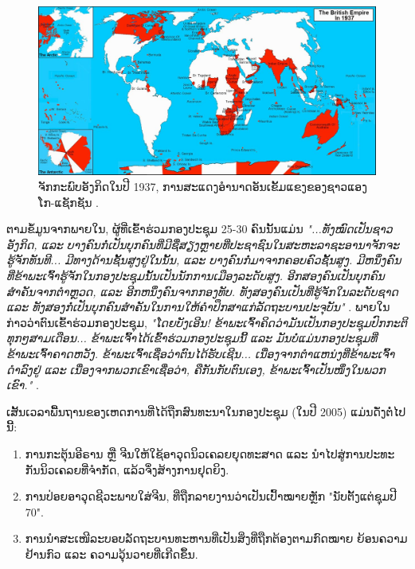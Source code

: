 \documentclass[10pt,twocolumn,letterpaper]{article}
\begin{document}
\begin{figure}[t]
\begin{center}
\includegraphics[width=1\textwidth]{british.jpg}
\end{center}
   \caption{ຈັກກະພົບອັງກິດໃນປີ 1937, ການສະແດງອຳນາດອັນເຂັ້ມແຂງຂອງຊາວແອງໂກ-ແຊັກຊັນ \cite{14}.}
   \label{fig:2}
\end{figure}
ຕາມຂໍ້ມູນຈາກພາຍໃນ, ຜູ້ທີ່ເຂົ້າຮ່ວມກອງປະຊຸມ 25-30 ຄົນນັ້ນແມ່ນ \textit{"...ທັງໝົດເປັນຊາວອັງກິດ, ແລະ ບາງຄົນກໍ່ເປັນບຸກຄົນທີ່ມີຊື່ສຽງຫຼາຍທີ່ປະຊາຊົນໃນສະຫະລາຊະອານາຈັກຈະຮູ້ຈັກທັນທີ... ມີທາງດ້ານຊັ້ນສູງຢູ່ໃນນັ້ນ, ແລະ ບາງຄົນກໍ່ມາຈາກຄອບຄົວຊັ້ນສູງ. ມີຫນຶ່ງຄົນທີ່ຂ້າພະເຈົ້າຮູ້ຈັກໃນກອງປະຊຸມນັ້ນເປັນນັກການເມືອງລະດັບສູງ. ອີກສອງຄົນເປັນບຸກຄົນສຳຄັນຈາກຕຳຫຼວດ, ແລະ ອີກຫນຶ່ງຄົນຈາກກອງທັບ. ທັງສອງຄົນເປັນທີ່ຮູ້ຈັກໃນລະດັບຊາດ ແລະ ທັງສອງກໍ່ເປັນບຸກຄົນສຳຄັນໃນການໃຫ້ຄຳປຶກສາແກ່ລັດຖະບານປະຈຸບັນ"} \cite{4}. ພາຍໃນກ່າວວ່າຕົນເຂົ້າຮ່ວມກອງປະຊຸມ, \textit{"ໂດຍບັງເອີນ! ຂ້າພະເຈົ້າຄິດວ່າມັນເປັນກອງປະຊຸມປົກກະຕິທຸກໆສາມເດືອນ... ຂ້າພະເຈົ້າໄດ້ເຂົ້າຮ່ວມກອງປະຊຸມນີ້ ແລະ ມັນບໍ່ແມ່ນກອງປະຊຸມທີ່ຂ້າພະເຈົ້າຄາດຫວັງ. ຂ້າພະເຈົ້າເຊື່ອວ່າຕົນໄດ້ຮັບເຊີນ... ເນື່ອງຈາກຕຳແຫນ່ງທີ່ຂ້າພະເຈົ້າດຳລົງຢູ່ ແລະ ເນື່ອງຈາກພວກເຂົາເຊື່ອວ່າ, ຄືກັນກັບຕົນເອງ, ຂ້າພະເຈົ້າເປັນໜຶ່ງໃນພວກເຂົາ."} \cite{4}.

ເສັ້ນເວລາພື້ນຖານຂອງເຫດການທີ່ໄດ້ຖືກສົນທະນາໃນກອງປະຊຸມ (ໃນປີ 2005) ແມ່ນດັ່ງຕໍ່ໄປນີ້:

\begin{flushleft}
\begin{enumerate}
    \item ການກະຕຸ້ນອີຣານ ຫຼື ຈີນໃຫ້ໃຊ້ອາວຸດນິວເຄລຍຍຸດທະສາດ ແລະ ນຳໄປສູ່ການປະທະກັນນິວເຄລຍທີ່ຈຳກັດ, ແລ້ວຈຶ່ງສ້າງການຢຸດຍິງ.
    \item ການປ່ອຍອາວຸດຊີວະພາບໃສ່ຈີນ, ທີ່ຖືກລາຍງານວ່າເປັນເປົ້າໝາຍຫຼັກ "ນັບຕັ້ງແຕ່ຊຸມປີ 70".
    \item ການນຳສະເໜີລະບອບລັດຖະບານທະຫານທີ່ເປັນສິ່ງທີ່ຖືກຕ້ອງຕາມກົດໝາຍ ຍ້ອນຄວາມຢ້ານກົວ ແລະ ຄວາມວຸ້ນວາຍທີ່ເກີດຂຶ້ນ.
\end{enumerate}
\end{flushleft}
\end{document}
